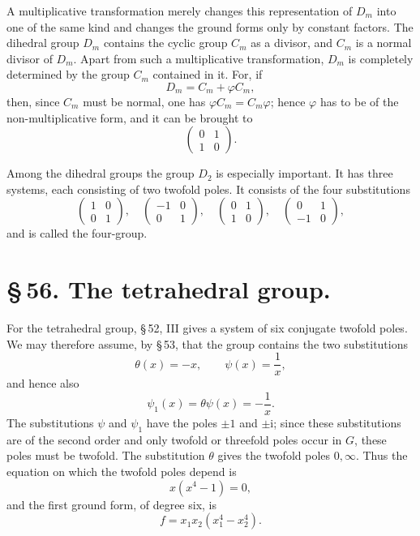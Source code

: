 \documentclass[11pt]{article}
\providecommand{\ii}{\mathrm{i}}
\providecommand{\mat}[4]{\begin{pmatrix}#1&#2\\#3&#4\end{pmatrix}}
\providecommand{\mat}[4]{\begin{pmatrix}#1&#2\\#3&#4\end{pmatrix}}
\begin{document}
A multiplicative transformation merely changes this representation of $D_m$ into one of the same kind and changes the ground forms only by constant factors. The dihedral group $D_m$ contains the cyclic group $C_m$ as a divisor, and $C_m$ is a normal divisor of $D_m$. Apart from such a multiplicative transformation, $D_m$ is completely determined by the group $C_m$ contained in it. For, if
\[
D_m=C_m+\varphi C_m,
\]
then, since $C_m$ must be normal, one has $\varphi C_m=C_m\varphi$; hence $\varphi$ has to be of the non-multiplicative form, and it can be brought to
\[
 \mat{0}{1}{1}{0}.
\]

Among the dihedral groups the group $D_2$ is especially important. It has three systems, each consisting of two twofold poles. It consists of the four substitutions
\begin{equation}
 \mat{1}{0}{0}{1},\quad
 \mat{-1}{0}{0}{1},\quad
 \mat{0}{1}{1}{0},\quad
 \mat{0}{1}{-1}{0},
\tag{7}
\end{equation}
and is called the four-group.

\section*{\S\,56. The tetrahedral group.}

For the tetrahedral group, \S\,52, III gives a system of six conjugate twofold poles. We may therefore assume, by \S\,53, that the group contains the two substitutions
\begin{equation}
 \theta(x)=-x,\qquad \psi(x)=\frac1x,
\tag{1}
\end{equation}
and hence also
\[
 \psi_1(x)=\theta\psi(x)=-\frac1x .
\]
The substitutions $\psi$ and $\psi_1$ have the poles $\pm1$ and $\pm\ii$; since these substitutions are of the second order and only twofold or threefold poles occur in $G$, these poles must be twofold. The substitution $\theta$ gives the twofold poles $0,\infty$. Thus the equation on which the twofold poles depend is
\[
 x(x^4-1)=0,
\]
and the first ground form, of degree six, is
\begin{equation}
 f=x_1x_2(x_1^4-x_2^4).
\tag{2}
\end{equation}
\end{document}
